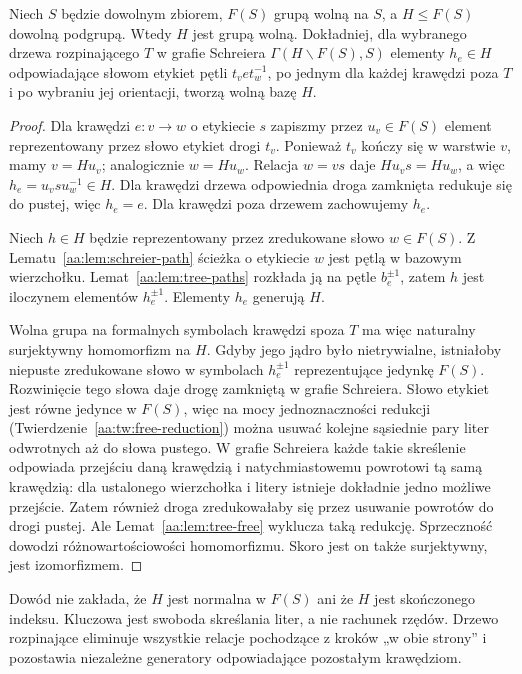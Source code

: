 \begin{twierdzenie}
\label{aa:tw:nielsen-schreier}
Niech $S$ będzie dowolnym zbiorem, $F(S)$ grupą wolną na $S$,
a $H\le F(S)$ dowolną podgrupą. Wtedy $H$ jest grupą wolną.
Dokładniej, dla wybranego drzewa rozpinającego $T$
w grafie Schreiera $\Gamma(H\backslash F(S),S)$ elementy
$h_e\in H$ odpowiadające słowom etykiet pętli $t_v e t_w^{-1}$,
po jednym dla każdej krawędzi poza $T$ i po wybraniu jej orientacji,
tworzą wolną bazę $H$.
\end{twierdzenie}
\begin{proof}
Dla krawędzi $e:v\to w$ o etykiecie $s$ zapiszmy
przez $u_v\in F(S)$ element reprezentowany przez słowo
etykiet drogi $t_v$. Ponieważ $t_v$ kończy się w warstwie $v$,
mamy $v=Hu_v$; analogicznie $w=Hu_w$.
Relacja $w=vs$ daje $Hu_v s=Hu_w$, a więc
$h_e=u_v s u_w^{-1}\in H$. Dla krawędzi drzewa
odpowiednia droga zamknięta redukuje się do pustej,
więc $h_e=e$. Dla krawędzi poza drzewem zachowujemy $h_e$.

Niech $h\in H$ będzie reprezentowany przez zredukowane
słowo $w\in F(S)$. Z Lematu~\ref{aa:lem:schreier-path}
ścieżka o etykiecie $w$ jest pętlą w bazowym wierzchołku.
Lemat~\ref{aa:lem:tree-paths} rozkłada ją na
pętle $b_e^{\pm1}$, zatem $h$ jest iloczynem elementów
$h_e^{\pm1}$. Elementy $h_e$ generują $H$.

Wolna grupa na formalnych symbolach krawędzi spoza $T$
ma więc naturalny surjektywny homomorfizm na $H$.
Gdyby jego jądro było nietrywialne, istniałoby niepuste
zredukowane słowo w symbolach $h_e^{\pm1}$ reprezentujące
jedynkę $F(S)$. Rozwinięcie tego słowa daje drogę zamkniętą
w grafie Schreiera. Słowo etykiet jest równe jedynce w
$F(S)$, więc na mocy jednoznaczności redukcji
(Twierdzenie~\ref{aa:tw:free-reduction}) można usuwać
kolejne sąsiednie pary liter odwrotnych aż do słowa pustego.
W grafie Schreiera każde takie skreślenie odpowiada
przejściu daną krawędzią i natychmiastowemu powrotowi
tą samą krawędzią: dla ustalonego wierzchołka i litery
istnieje dokładnie jedno możliwe przejście.
Zatem również droga zredukowałaby się przez usuwanie
powrotów do drogi pustej.
Ale Lemat~\ref{aa:lem:tree-free} wyklucza taką redukcję.
Sprzeczność dowodzi różnowartościowości homomorfizmu.
Skoro jest on także surjektywny, jest izomorfizmem.
\end{proof}

\begin{uwaga}
Dowód nie zakłada, że $H$ jest normalna w $F(S)$ ani że
$H$ jest skończonego indeksu. Kluczowa jest swoboda
skreślania liter, a nie rachunek rzędów.
Drzewo rozpinające eliminuje wszystkie relacje pochodzące
z kroków „w obie strony” i pozostawia niezależne generatory
odpowiadające pozostałym krawędziom.
\end{uwaga}

